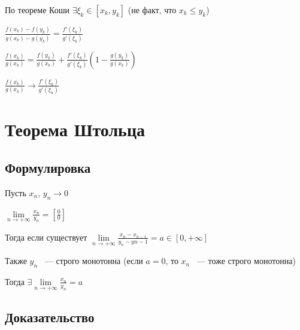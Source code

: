 \documentclass{article}
\begin{document}
			По теореме Коши $\exists \xi_k \in [x_k, y_k]$ (не факт, что $x_k \leq y_k$)
			
			$\frac{f(x_k) - f(y_k)}{g(x_k) - g(y_k)} = \frac{f'(\xi_k)}{g'(\xi_k)}$
			
			$\frac{f(x_k)}{g(x_k)} = \frac{f(y_k)}{g(x_k)} + \frac{f'(\xi_k)}{g'(\xi_k)} \left( 1 - \frac{g(y_k)}{g(x_k)} \right)$
			
			$\frac{f(x_k)}{g(x_k)} \rightarrow \frac{f'(\xi_k)}{g'(\xi_k)}$
			
	\newpage
	
	\section{Теорема Штольца}
	
		\subsection{Формулировка}
		
			Пусть $x_n$, $y_n \rightarrow 0$
			
			$\lim\limits_{n \rightarrow +\infty} \frac{x_n}{y_n} = \left[ \frac{0}{0} \right]$
			
			Тогда если существует $\lim\limits_{n \rightarrow +\infty} \frac{x_n - x_{n - 1}}{y_n - y{n - 1}} = a \in [0, +\infty]$
			
			Также $y_n$ ~--- строго монотонна (если $a = 0$, то $x_n$ ~--- тоже строго монотонна)
			
			Тогда $\exists \lim\limits_{n \rightarrow +\infty} \frac{x_n}{y_n} = a$
			
		\subsection{Доказательство}
		
\end{document}
